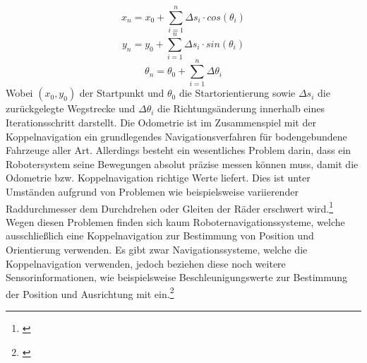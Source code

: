 \begin{equation}
x_{n} = x_{0} + \sum_{i=1}^{n} \Delta{}s_{i} \cdot cos(\theta{}_{i})
\end{equation}
\begin{equation}
y_{n} = y_{0} + \sum_{i=1}^{n} \Delta{}s_{i} \cdot sin(\theta{}_{i})
\end{equation}
\begin{equation}
\theta{}_{n} = \theta{}_{0} + \sum_{i=1}^{n} \Delta{}\theta{}_{i}
\end{equation}
Wobei $(x_{0},y_{0})$ der Startpunkt und $\theta{}_{0}$ die Startorientierung sowie $\Delta{}s_{i}$ die zurückgelegte Wegstrecke und $\Delta{}\theta{}_{i}$ die Richtungsänderung innerhalb eines Iterationsschritt darstellt.
\newline
Die Odometrie ist im Zusammenspiel mit der Koppelnavigation ein grundlegendes Navigationsverfahren für bodengebundene Fahrzeuge aller Art. Allerdings besteht ein wesentliches Problem darin, dass ein Robotersystem seine Bewegungen absolut präzise messen können muss, damit die Odometrie bzw. Koppelnavigation richtige Werte liefert. Dies ist unter Umständen aufgrund
von Problemen wie beispielsweise variierender Raddurchmesser dem Durchdrehen oder Gleiten der Räder erschwert wird.\footnote{\citep[vgl.][Handbuch Robotik, Seite 108]{Haun.HandbuchRobotik}\label{note18}}
\newline
Wegen diesen Problemen finden sich kaum Roboternavigationssysteme, welche ausschließlich eine Koppelnavigation zur Bestimmung von Position und Orientierung verwenden. Es gibt zwar Navigationssysteme, welche die Koppelnavigation verwenden, jedoch beziehen diese noch weitere Sensorinformationen, wie beispielsweise Beschleunigungswerte zur Bestimmung der Position und Ausrichtung mit ein.\footnote{\citep[vgl.][Mobile Robotik, Seite 115]{Nehmzow.MobileRobotik}\label{note19}}
